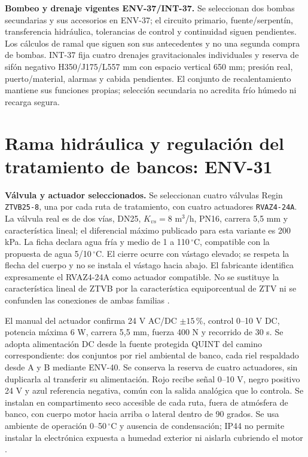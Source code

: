\textbf{Bombeo y drenaje vigentes ENV-37/INT-37.} Se seleccionan dos bombas secundarias y sus accesorios en ENV-37; el circuito primario, fuente/serpentín, transferencia hidráulica, tolerancias de control y continuidad siguen pendientes. Los cálculos de ramal que siguen son sus antecedentes y no una segunda compra de bombas. INT-37 fija cuatro drenajes gravitacionales individuales y reserva de sifón negativo H350/J175/L557 mm con espacio vertical 650 mm; presión real, puerto/material, alarmas y cabida pendientes. El conjunto de recalentamiento mantiene sus funciones propias; selección secundaria no acredita frío húmedo ni recarga segura.

\section{Rama hidráulica y regulación del tratamiento de bancos: ENV-31}
\label{sec:ambiente-env31}
\textbf{Válvula y actuador seleccionados.} Se seleccionan cuatro válvulas Regin \texttt{ZTVB25-8}, una por cada ruta de tratamiento, con cuatro actuadores \texttt{RVAZ4-24A}. La válvula real es de dos vías, DN25, $K_{vs}=8$ m$^3$/h, PN16, carrera 5,5 mm y característica lineal; el diferencial máximo publicado para esta variante es 200 kPa. La ficha declara agua fría y medio de 1 a 110\,$^{\circ}$C, compatible con la propuesta de agua 5/10\,$^{\circ}$C. El cierre ocurre con vástago elevado; se respeta la flecha del cuerpo y no se instala el vástago hacia abajo. El fabricante identifica expresamente el RVAZ4-24A como actuador compatible. No se sustituye la característica lineal de ZTVB por la característica equiporcentual de ZTV ni se confunden las conexiones de ambas familias \parencite[pp.~1--2]{lote31-ztvb}.

El manual del actuador confirma 24 V AC/DC $\pm15\,\%$, control 0--10 V DC, potencia máxima 6 W, carrera 5,5 mm, fuerza 400 N y recorrido de 30 s. Se adopta alimentación DC desde la fuente protegida QUINT del camino correspondiente: dos conjuntos por riel ambiental de banco, cada riel respaldado desde A y B mediante ENV-40. Se conserva la reserva de cuatro actuadores, sin duplicarla al transferir su alimentación. Rojo recibe señal 0--10 V, negro positivo 24 V y azul referencia negativa, común con la salida analógica que lo controla. Se instalan en compartimento seco accesible de cada ruta, fuera de atmósfera de banco, con cuerpo motor hacia arriba o lateral dentro de 90 grados. Se usa ambiente de operación 0--50\,$^{\circ}$C y ausencia de condensación; IP44 no permite instalar la electrónica expuesta a humedad exterior ni aislarla cubriendo el motor \parencite[p.~1]{lote31-rvaz-manual}\parencite{lote31-rvaz-ficha}.

